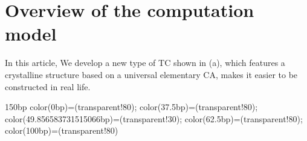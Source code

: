 \documentclass[twocolumn,superscriptaddress,english,showpacs,longbibliography]{revtex4-2}
\begin{document}






\section{Overview of the computation model}\label{sec:Overview-of-main-results}
In this article, We develop a new type of TC shown in (a), which features a crystalline structure based on a universal elementary CA, makes it easier to be constructed in real life. 

 {150bp} {color(0bp)=(transparent!80);
color(37.5bp)=(transparent!80);
color(49.856583731515066bp)=(transparent!30);
color(62.5bp)=(transparent!80);
color(100bp)=(transparent!80) } 
\end{document}
